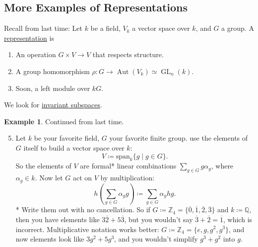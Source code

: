 \documentclass[12pt]{article}
\newcommand{\z}{\mathbb{Z}}
\newcommand{\q}{\mathbb{Q}}
\newcommand{\spank}[1]{\mathrm{span}_{#1}}
\theoremstyle{definition}
\newtheorem{example}{Example}[section]
\DeclareMathOperator\Aut{Aut}
\DeclareMathOperator\GL{GL}
\begin{document}
\subsection{More Examples of Representations}
Recall from last time: Let $k$ be a field, $V_k$ a vector space over $k$, and $G$ a group. A \underline{representation} is 
\begin{enumerate}
    \item An operation $G\times V\to V$ that respects structure.
    \item A group homomorphism $\rho:G\to\Aut(V_k)\simeq\GL_n(k)$.
    \item Soon, a left module over $kG$.
\end{enumerate}
We look for \underline{invariant subspaces}.
\begin{example}
    Continued from last time.
    \begin{enumerate}
        \setcounter{enumi}{4}
        \item Let $k$ be your favorite field, $G$ your favorite finite group. use the elements of $G$ itself to build a vector space over $k$:
        \begin{equation}
            V\coloneqq \spank{k}\{g\mid g\in G\}.
        \end{equation}
        So the elements of $V$ are formal* linear combinations $\sum\limits_{g\in G}g\alpha_g$, where $\alpha_g\in k$. Now let $G$ act on $V$ by multiplication:
        \begin{equation}
            h\left(\sum\limits_{g\in G}\alpha_gg\right)\coloneqq \sum\limits_{g\in G}\alpha_ghg.
        \end{equation}
        * Write them out with no cancellation. So if $G\coloneqq \z_4=\{\overline{0},\overline{1},\overline{2},\overline{3}\}$ and $k\coloneqq \q$, then you have elements like $3\overline{2}+5\overline{3}$, but you wouldn't say $\overline{3}+\overline{2}=\overline{1}$, which is incorrect. Multiplicative notation works better: $G\coloneqq \z_4=\{e,g,g^2,g^3\}$, and now elements look like $3g^2+5g^3$, and you wouldn't simplify $g^3+g^2$ into $g$.
        

\end{enumerate}
\end{example}
\end{document}
